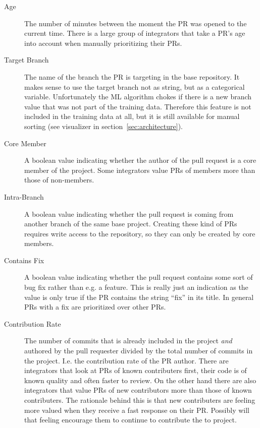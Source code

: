 \begin{description}
\item[Age]
The number of minutes between the moment the PR was opened to the current time.
There is a large group of integrators that take a PR's age into account when manually prioritizing their PRs.

\item[Target Branch]
The name of the branch the PR is targeting in the base repository.
It makes sense to use the target branch not as string, but as a categorical variable.
Unfortunately the ML algorithm chokes if there is a new branch value that was not part of the training data.
Therefore this feature is not included in the training data at all, but it is still available for manual sorting (see visualizer in section~\ref{sec:architecture}).

\item[Core Member]
A boolean value indicating whether the author of the pull request is a core member of the project.
Some integrators value PRs of members more than those of non-members.

\item[Intra-Branch]
A boolean value indicating whether the pull request is coming from another branch of the same base project.
Creating these kind of PRs requires write access to the repository, so they can only be created by core members.

\item[Contains Fix]
A boolean value indicating whether the pull request contains some sort of bug fix rather than e.g. a feature.
This is really just an indication as the value is only true if the PR contains the string ``fix'' in its title.
In general PRs with a fix are prioritized over other PRs.

\item[Contribution Rate]
The number of commits that is already included in the project \emph{and} authored by the pull requester divided by the total number of commits in the project.
I.e. the contribution rate of the PR author.
There are integrators that look at PRs of known contributers first, their code is of known quality and often faster to review.
On the other hand there are also integrators that value PRs of new contributors more than those of known contributers.
The rationale behind this is that new contributers are feeling more valued when they receive a fast response on their PR.
Possibly will that feeling encourage them to continue to contribute the to project.


\end{description}
